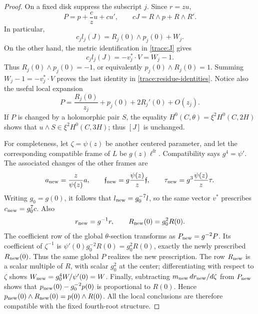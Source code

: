 \begin{proof}
On a fixed disk suppress the subscript $j$.  Since $r=zu$,
\[
 P=p+\frac{c}{z}u+cu',\qquad
 cJ=R\wedge p+R\wedge R'.
\]
In particular,
\[
 c_jl_j(J)=R_j(0)\wedge p_j(0)+W_j.
\]
On the other hand, the metric identification in \eqref{trace:J} gives
\[
 c_jl_j(J)=-v_j^*\cdot V=W_j-1.
\]
Thus $R_j(0)\wedge p_j(0)=-1$, or equivalently
$p_j(0)\wedge R_j(0)=1$.  Summing
$W_j-1=-v_j^*\cdot V$ proves the last identity in
\eqref{trace:residue-identities}.  Notice also the useful local expansion
\begin{equation}\label{trace:P-constant}
 P=\frac{R_j(0)}{z_j}
       +p_j(0)+2R_j'(0)+O(z_j).
\end{equation}
If $P$ is changed by a holomorphic pair $S$, the equality
$H^0(C,\theta)=\xi^2H^0(C,2H)$ shows that
$u\wedge S\in\xi^2H^0(C,3H)$; thus $[J]$ is unchanged.

For completeness, let $\zeta=\psi(z)$ be another centered parameter,
and let the corresponding compatible frame of $L$ be $g(z)\ell^{\mathrm{fr}}$.
Compatibility says $g^4=\psi'$.  The associated changes of the other
frames are
\[
 a_{\rm new}=\frac{z}{\psi(z)}a,\qquad
 \mathfrak f_{\rm new}=g\frac{\psi(z)}{z}\mathfrak f,
 \qquad \tau_{\rm new}=g^3\frac{\psi(z)}{z}\tau.
\]
Writing $g_0=g(0)$, it follows that
$l_{\rm new}=g_0^{-7}l$, so the same vector $v^*$ prescribes
$c_{\rm new}=g_0^7c$.  Also
\[
 r_{\rm new}=g^{-1}r,\qquad
 R_{\rm new}(0)=g_0^2R(0).
\]
The coefficient row of the global $\theta$-section transforms as
$P_{\rm new}=g^{-2}P$.  Its coefficient of $\zeta^{-1}$ is
$\psi'(0)g_0^{-2}R(0)=g_0^2R(0)$, exactly the newly prescribed
$R_{\rm new}(0)$.  Thus the same global $P$ realizes the new
prescription.  The row $R_{\rm new}$ is a scalar multiple of $R$,
with scalar $g_0^2$ at the center; differentiating with respect to
$\zeta$ shows $W_{\rm new}=g_0^4W/\psi'(0)=W$.
Finally, subtracting $m_{\rm new}\,d r_{\rm new}/d\zeta$ from
$P_{\rm new}$ shows that
$p_{\rm new}(0)-g_0^{-2}p(0)$ is proportional to $R(0)$.
Hence $p_{\rm new}(0)\wedge R_{\rm new}(0)=p(0)\wedge R(0)$.
All the local conclusions are therefore compatible with the fixed
fourth-root structure.
\end{proof}
